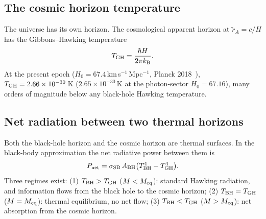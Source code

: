 \subsection{The cosmic horizon temperature}
The universe has its own horizon. The cosmological apparent horizon at $\tilde r_A=c/H$ has the Gibbons--Hawking temperature~\cite{GibbonsHawking1977}
\begin{equation}
T_{\rm GH}=\frac{\hbar H}{2\pi k_{\mathrm B}}.\label{eq:bh_TGH}
\end{equation}
At the present epoch ($H_0=67.4$\,km\,s$^{-1}$\,Mpc$^{-1}$, Planck 2018~\cite{Planck2018VI}), $T_{\rm GH}=2.66\times10^{-30}$\,K ($2.65\times10^{-30}$\,K at the photon-sector $H_0=67.16$), many orders of magnitude below any black-hole Hawking temperature. \calc

\subsection{Net radiation between two thermal horizons}
Both the black-hole horizon and the cosmic horizon are thermal surfaces. In the black-body approximation the net radiative power between them is
\begin{equation}
P_{\rm net}=\sigma_{\rm SB}\,A_{\rm BH}\big(T_{\rm BH}^4-T_{\rm GH}^4\big).\label{eq:bh_Pnet}
\end{equation}
Three regimes exist: (1) $T_{\rm BH}>T_{\rm GH}$ ($M<M_{\rm eq}$): standard Hawking radiation, and information flows from the black hole to the cosmic horizon;
(2) $T_{\rm BH}=T_{\rm GH}$ ($M=M_{\rm eq}$): thermal equilibrium, no net flow; (3) $T_{\rm BH}<T_{\rm GH}$ ($M>M_{\rm eq}$): net absorption from the cosmic horizon. \derived

